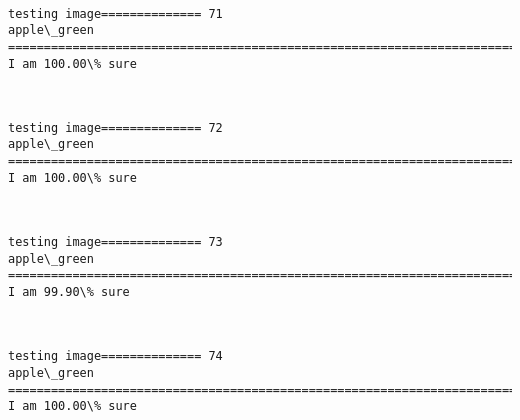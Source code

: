 \documentclass[11pt]{article}
\begin{document}
    \begin{center}
    \end{center}
    { \hspace*{\fill} \\}
    
    \begin{Verbatim}[commandchars=\\\{\}]
testing image============== 71
apple\_green
============================================================================
I am 100.00\% sure

    \end{Verbatim}

    \begin{center}
    \end{center}
    { \hspace*{\fill} \\}
    
    \begin{Verbatim}[commandchars=\\\{\}]
testing image============== 72
apple\_green
============================================================================
I am 100.00\% sure

    \end{Verbatim}

    \begin{center}
    \end{center}
    { \hspace*{\fill} \\}
    
    \begin{Verbatim}[commandchars=\\\{\}]
testing image============== 73
apple\_green
============================================================================
I am 99.90\% sure

    \end{Verbatim}

    \begin{center}
    \end{center}
    { \hspace*{\fill} \\}
    
    \begin{Verbatim}[commandchars=\\\{\}]
testing image============== 74
apple\_green
============================================================================
I am 100.00\% sure

    \end{Verbatim}
\end{document}
